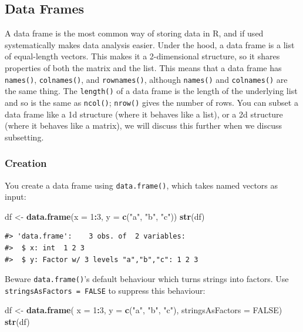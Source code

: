 \documentclass[]{book}
\newenvironment{Shaded}{\begin{snugshade}}{\end{snugshade}}
\newcommand{\KeywordTok}[1]{\textcolor[rgb]{0.13,0.29,0.53}{\textbf{#1}}}
\newcommand{\DataTypeTok}[1]{\textcolor[rgb]{0.13,0.29,0.53}{#1}}
\newcommand{\DecValTok}[1]{\textcolor[rgb]{0.00,0.00,0.81}{#1}}
\newcommand{\StringTok}[1]{\textcolor[rgb]{0.31,0.60,0.02}{#1}}
\newcommand{\OtherTok}[1]{\textcolor[rgb]{0.56,0.35,0.01}{#1}}
\newcommand{\OperatorTok}[1]{\textcolor[rgb]{0.81,0.36,0.00}{\textbf{#1}}}
\newcommand{\NormalTok}[1]{#1}
\theoremstyle{definition}
\theoremstyle{definition}
\theoremstyle{definition}
\theoremstyle{remark}
\begin{document}
\subsection{Data Frames}\label{data-frames}

A data frame is the most common way of storing data in R, and if used
systematically makes data analysis easier. Under the hood, a data frame
is a list of equal-length vectors. This makes it a 2-dimensional
structure, so it shares properties of both the matrix and the list. This
means that a data frame has \texttt{names()}, \texttt{colnames()}, and
\texttt{rownames()}, although \texttt{names()} and \texttt{colnames()}
are the same thing. The \texttt{length()} of a data frame is the length
of the underlying list and so is the same as \texttt{ncol()};
\texttt{nrow()} gives the number of rows. You can subset a data frame
like a 1d structure (where it behaves like a list), or a 2d structure
(where it behaves like a matrix), we will discuss this further when we
discuss subsetting.

\subsubsection{Creation}\label{creation}

You create a data frame using \texttt{data.frame()}, which takes named
vectors as input:

\begin{Shaded}
\begin{Highlighting}[]
\NormalTok{df <-}\StringTok{ }\KeywordTok{data.frame}\NormalTok{(}\DataTypeTok{x =} \DecValTok{1}\OperatorTok{:}\DecValTok{3}\NormalTok{, }\DataTypeTok{y =} \KeywordTok{c}\NormalTok{(}\StringTok{"a"}\NormalTok{, }\StringTok{"b"}\NormalTok{, }\StringTok{"c"}\NormalTok{))}
\KeywordTok{str}\NormalTok{(df)}
\end{Highlighting}
\end{Shaded}

\begin{verbatim}
#> 'data.frame':    3 obs. of  2 variables:
#>  $ x: int  1 2 3
#>  $ y: Factor w/ 3 levels "a","b","c": 1 2 3
\end{verbatim}

Beware \texttt{data.frame()}'s default behaviour which turns strings
into factors. Use \texttt{stringsAsFactors\ =\ FALSE} to suppress this
behaviour:

\begin{Shaded}
\begin{Highlighting}[]
\NormalTok{df <-}\StringTok{ }\KeywordTok{data.frame}\NormalTok{(}
  \DataTypeTok{x =} \DecValTok{1}\OperatorTok{:}\DecValTok{3}\NormalTok{,}
  \DataTypeTok{y =} \KeywordTok{c}\NormalTok{(}\StringTok{"a"}\NormalTok{, }\StringTok{"b"}\NormalTok{, }\StringTok{"c"}\NormalTok{),}
  \DataTypeTok{stringsAsFactors =} \OtherTok{FALSE}\NormalTok{)}
\KeywordTok{str}\NormalTok{(df)}
\end{Highlighting}
\end{Shaded}
\end{document}
